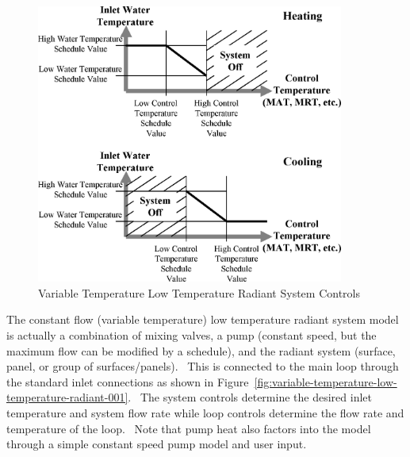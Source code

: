 \begin{figure}[hbtp] %
\centering
\includegraphics[width=0.9\textwidth, height=0.9\textheight, keepaspectratio=true]{media/image6054.png}
\caption{Variable Temperature Low Temperature Radiant System Controls \protect \label{fig:variable-temperature-low-temperature-radiant}}
\end{figure}

The constant flow (variable temperature) low temperature radiant system model is actually a combination of mixing valves, a pump (constant speed, but the maximum flow can be modified by a schedule), and the radiant system (surface, panel, or group of surfaces/panels).~ This is connected to the main loop through the standard inlet connections as shown in Figure~\ref{fig:variable-temperature-low-temperature-radiant-001}.~ The system controls determine the desired inlet temperature and system flow rate while loop controls determine the flow rate and temperature of the loop.~ Note that pump heat also factors into the model through a simple constant speed pump model and user input.

